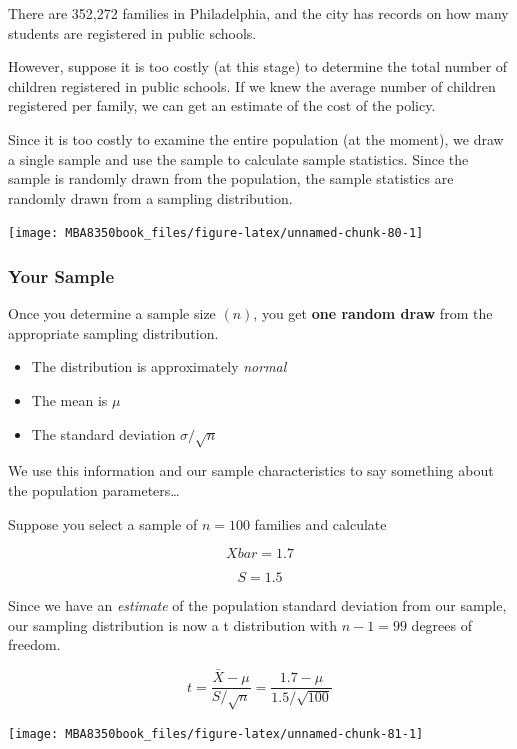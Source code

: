 \documentclass[
]{book}
\begin{document}
There are 352,272 families in Philadelphia, and the city has records on how many students are registered in public schools.

However, suppose it is too costly (at this stage) to determine the total number of children registered in public schools. If we knew the average number of children registered per family, we can get an estimate of the cost of the policy.

Since it is too costly to examine the entire population (at the moment), we draw a single sample and use the sample to calculate sample statistics. Since the sample is randomly drawn from the population, the sample statistics are randomly drawn from a sampling distribution.

\begin{center}\texttt{[image: MBA8350book\_files/figure-latex/unnamed-chunk-80-1]} \end{center}

\hypertarget{your-sample}{%
\subsubsection*{Your Sample}\label{your-sample}}

Once you determine a sample size \((n)\), you get \textbf{one random draw} from the appropriate sampling distribution.

\begin{itemize}
\item
  The distribution is approximately \emph{normal}
\item
  The mean is \(\mu\)
\item
  The standard deviation \(\sigma/\sqrt{n}\)
\end{itemize}

We use this information and our sample characteristics to say something about the population parameters\ldots{}

Suppose you select a sample of \(n=100\) families and calculate

\[Xbar = 1.7\]

\[S = 1.5\]

Since we have an \emph{estimate} of the population standard deviation from our sample, our sampling distribution is now a t distribution with \(n-1 = 99\) degrees of freedom.

\[ t = \frac{\bar{X}-\mu}{S/\sqrt{n}}=\frac{1.7-\mu}{1.5/\sqrt{100}}\]

\begin{center}\texttt{[image: MBA8350book\_files/figure-latex/unnamed-chunk-81-1]} \end{center}
\end{document}
